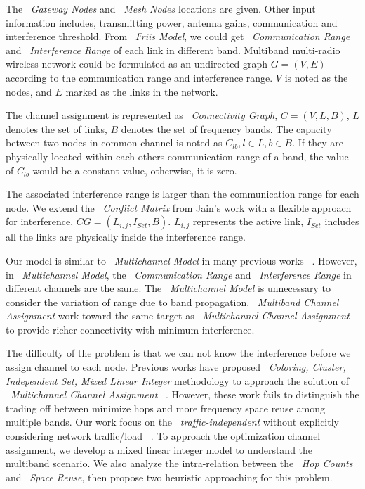 The ~\emph{Gateway Nodes} and ~\emph{Mesh Nodes} locations are given. 
Other input information includes, transmitting power, antenna gains, communication and interference threshold. From ~\emph{Friis Model}, we could get ~\emph{Communication Range} and ~\emph{Interference Range} of each link in different band. 
Multiband multi-radio wireless network could be formulated as an undirected graph $G=(V,E)$ according to the communication range and interference range. $V$ is noted as the nodes, and $E$ marked as the links in the network.

The channel assignment is represented as ~\emph{Connectivity Graph}, $C=(V,L,B)$, $L$ denotes the set of links, $B$ denotes the set of frequency bands. 
The capacity between two nodes in common channel is noted as $C_{lb}, l \in L,b \in B$. If they are physically located within each others communication range of a band, the value of $C_{lb}$ would be a constant value, otherwise, it is zero. 

The associated interference range is larger than the communication range for each node. We extend the ~\emph{Conflict Matrix} from Jain's work with a flexible approach for interference, $CG=(L_{i,j},I_{Set},B)$. $L_{i,j}$ represents the active link, $I_{Set}$ includes all the links are physically inside the interference range. 

Our model is similar to ~\emph{Multichannel Model} in many previous works ~\cite{tang2005interference,yuan2006cross,si2010overview}. However, in ~\emph{Multichannel Model}, the ~\emph{Communication Range} and ~\emph{Interference Range} in different channels are the same. The ~\emph{Multichannel Model} is unnecessary to consider the variation of range due to band propagation.
~\emph{Multiband Channel Assignment} work toward the same target as ~\emph{Multichannel Channel Assignment} to provide richer connectivity with minimum interference.

The difficulty of the problem is that we can not know the interference before we assign channel to each node. Previous works have proposed ~\emph{Coloring, Cluster, Independent Set, Mixed Linear Integer} methodology to approach the solution of ~\emph{Multichannel Channel Assignment} ~\cite{mishra2005weighted,peng2012efficient,tang2005interference}. 
However, these work fails to distinguish the trading off between minimize hops and more frequency space reuse among multiple bands.
Our work focus on the ~\emph{traffic-independent} 
without explicitly considering network traffic/load ~\cite{marina2010topology}.
To approach the optimization channel assignment, we develop a mixed linear integer model to understand the multiband scenario. We also analyze the intra-relation between the ~\emph{Hop Counts} and ~\emph{Space Reuse}, then propose two heuristic approaching for this problem.

